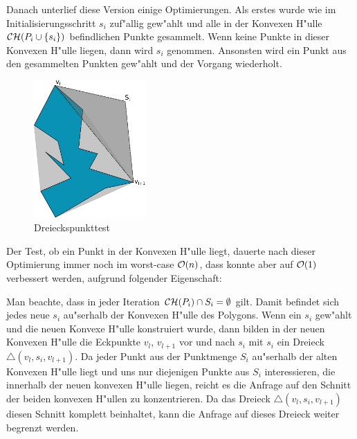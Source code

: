     Danach unterlief diese Version einige Optimierungen. Als erstes wurde wie im
    Initialisierungsschritt $s_i$ zuf"allig gew"ahlt und alle in der Konvexen
    H"ulle $\mathcal{CH}(P_i \cup \{s_i\})$ befindlichen Punkte gesammelt. Wenn keine
    Punkte in dieser Konvexen H"ulle liegen, dann wird $s_i$ genommen. Ansonsten
    wird ein Punkt aus den gesammelten Punkten gew"ahlt und der Vorgang
    wiederholt.
    \begin{figure}
      \vspace{-20pt}
      \begin{center}
        \includegraphics[width=0.38\textwidth]{img/steadyTriangle.eps}
      \end{center}
      \vspace{-20pt}
      \caption{Dreieckspunkttest}
      \vspace{-10pt}
      \label{fig:steadyTraingle}
    \end{figure}
    Der Test, ob ein Punkt in der Konvexen H"ulle liegt, dauerte
    nach dieser Optimierung immer noch im worst-case $\mathcal{O}(n)$, dass konnte
    aber auf $\mathcal{O}(1)$ verbessert werden, aufgrund folgender Eigenschaft:

    Man beachte, dass in jeder Iteration $\mathcal{CH}(P_{i}) \cap S_i = \emptyset$ gilt.
    Damit befindet sich jedes neue $s_i$ au"serhalb der Konvexen H"ulle des
    Polygons. Wenn ein $s_i$ gew"ahlt und die neuen Konvexe H"ulle konstruiert
    wurde, dann bilden in der neuen Konvexen H"ulle die Eckpunkte $v_l$,
    $v_{l+1}$ vor und nach $s_i$ mit $s_i$ ein Dreieck $\triangle(v_l, s_i,
    v_{l+1})$. Da jeder Punkt aus der Punktmenge $S_i$ au"serhalb der alten
    Konvexen H"ulle liegt und uns nur diejenigen Punkte aus $S_i$ interessieren,
    die innerhalb der neuen konvexen H"ulle liegen, reicht es die Anfrage auf
    den Schnitt der beiden konvexen H"ullen zu konzentrieren. Da das Dreieck
    $\triangle(v_l, s_i, v_{l+1})$ diesen Schnitt komplett beinhaltet, kann die
    Anfrage auf dieses Dreieck weiter begrenzt werden.

